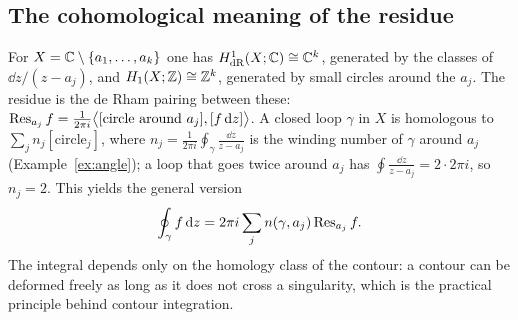 \subsection{The cohomological meaning of the residue}\label{sec:rescohom}

For $X=\mathbb{C}\setminus\{a_1,\dots,a_k\}$ one has $H^1_{\mathrm{dR}}(X;\mathbb{C})\cong\mathbb{C}^k$, generated by the classes of $\dd z/(z-a_j)$, and $H_1(X;\mathbb{Z})\cong\mathbb{Z}^k$, generated by small circles around the $a_j$. The residue is the de Rham pairing between these:
$\operatorname{Res}_{a_j}f=\frac1{2\pi i}\bigl\langle[\text{circle around }a_j],[f\,\mathrm{d} z]\bigr\rangle$.
A closed loop $\gamma$ in $X$ is homologous to $\sum_jn_j[\text{circle}_j]$, where $n_j=\frac1{2\pi i}\oint_\gamma\frac{\dd z}{z-a_j}$ is the winding number of $\gamma$ around $a_j$ (Example~\ref{ex:angle}); \eg a loop that goes twice around $a_j$ has $\oint\frac{\dd z}{z-a_j}=2\cdot2\pi i$, so $n_j=2$. This yields the general version
\begin{equation}\label{eq:winding}
\oint_\gamma f\,\mathrm{d} z=2\pi i\sum_jn(\gamma,a_j)\operatorname{Res}_{a_j}f .
\end{equation}
The integral depends only on the homology class of the contour: a contour can be deformed freely as long as it does not cross a singularity, which is the practical principle behind contour integration.
